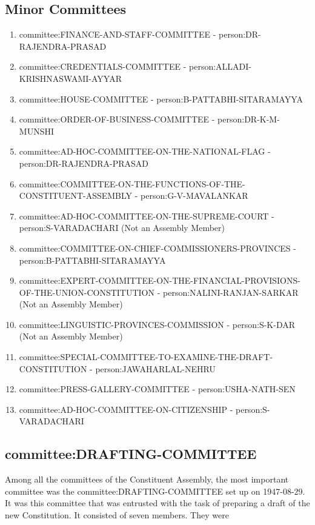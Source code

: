 \subsection{Minor Committees}

\begin{enumerate}
  \item \gls{committee:FINANCE-AND-STAFF-COMMITTEE} - \gls{person:DR-RAJENDRA-PRASAD}
  \item \gls{committee:CREDENTIALS-COMMITTEE} - \gls{person:ALLADI-KRISHNASWAMI-AYYAR}
  \item \gls{committee:HOUSE-COMMITTEE} - \gls{person:B-PATTABHI-SITARAMAYYA}
  \item \gls{committee:ORDER-OF-BUSINESS-COMMITTEE} - \gls{person:DR-K-M-MUNSHI}
  \item \gls{committee:AD-HOC-COMMITTEE-ON-THE-NATIONAL-FLAG} - \gls{person:DR-RAJENDRA-PRASAD}
  \item \gls{committee:COMMITTEE-ON-THE-FUNCTIONS-OF-THE-CONSTITUENT-ASSEMBLY} - \gls{person:G-V-MAVALANKAR}
  \item \gls{committee:AD-HOC-COMMITTEE-ON-THE-SUPREME-COURT} - \gls{person:S-VARADACHARI} (Not an Assembly Member)
  \item \gls{committee:COMMITTEE-ON-CHIEF-COMMISSIONERS-PROVINCES} - \gls{person:B-PATTABHI-SITARAMAYYA}
  \item \gls{committee:EXPERT-COMMITTEE-ON-THE-FINANCIAL-PROVISIONS-OF-THE-UNION-CONSTITUTION} - \gls{person:NALINI-RANJAN-SARKAR} (Not an Assembly Member)
  \item \gls{committee:LINGUISTIC-PROVINCES-COMMISSION} - \gls{person:S-K-DAR} (Not an Assembly Member)
  \item \gls{committee:SPECIAL-COMMITTEE-TO-EXAMINE-THE-DRAFT-CONSTITUTION} - \gls{person:JAWAHARLAL-NEHRU}
  \item \gls{committee:PRESS-GALLERY-COMMITTEE} - \gls{person:USHA-NATH-SEN}
  \item \gls{committee:AD-HOC-COMMITTEE-ON-CITIZENSHIP} - \gls{person:S-VARADACHARI}
\end{enumerate}


\subsection{\gls{committee:DRAFTING-COMMITTEE}}

Among all the committees of the Constituent Assembly, the most important committee was the \gls{committee:DRAFTING-COMMITTEE} set up on 1947-08-29. It was this committee that was entrusted with the task of preparing a draft of the new Constitution. It consisted of seven members. They were

